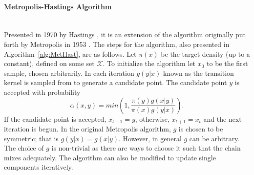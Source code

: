 	\paragraph{Metropolis-Hastings Algorithm}~\\
\noindent
	Presented in 1970 by Hastings \cite{hastings1970monte}, it is an extension of the algorithm originally put forth by Metropolis in 1953 \cite{metropolis1953equation}.
	The steps for the algorithm, also presented in Algorithm~\ref{alg:MetHast}, are as follows. Let $\pi(x)$ be the target density (up to a constant), defined on some set ${\mathscr X}$.
	To initialize the algorithm let $x_0$ to be the first sample, chosen arbitrarily. In each iteration $g(y|x)$ 
    known as the {transition kernel} is sampled from to generate a candidate point. The candidate point $y$ is accepted with probability 
	    \begin{equation}
	        \alpha(x,y) = min\left(1,\frac{\pi(y)g(x|y)}{\pi(x)g(y|x)}\right).
	    \end{equation}
	If the candidate point is accepted, $x_{t+1} = y$, otherwise, $x_{t+1} = x_t$ and the next iteration is begun. In the original Metropolis algorithm, $g$ is chosen to be symmetric; that is $g(y|x) = g(x|y)$. However, in general $g$ can be arbitrary. The choice of $g$ is non-trivial as there are ways to choose it such that the chain mixes adequately. The algorithm can also be modified to update single components iteratively. %
	
